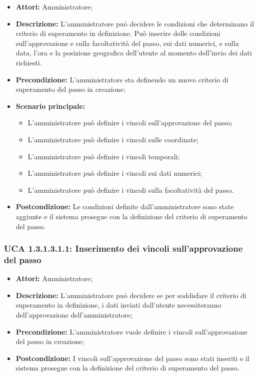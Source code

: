 \begin{itemize}
\item \textbf{Attori:}
Amministratore;
\item \textbf{Descrizione:}
L'amministratore può decidere le condizioni che determinano il criterio di superamento in definizione.
Può inserire delle condizioni sull'approvazione e sulla facoltatività del passo, sui dati numerici, e sulla data, l'ora e la posizione geografica dell'utente al momento dell'invio dei dati richiesti.
\item \textbf{Precondizione:}
L'amministratore sta definendo un nuovo criterio di superamento del passo in creazione;
\item \textbf{Scenario principale:}
\begin{itemize}
\item L'amministratore può definire i vincoli sull'approvazione del passo;
\item L'amministratore può definire i vincoli sulle coordinate;
\item L'amministratore può definire i vincoli temporali;
\item L'amministratore può definire i vincoli sui dati numerici;
\item L'amministratore può definire i vincoli sulla facoltatività del passo.
\end{itemize}
\item \textbf{Postcondizione:}
Le condizioni definite dall'amministratore sono state aggiunte e il sistema prosegue con la definizione del criterio di superamento del passo.
\end{itemize}

\hypertarget{A1.3.1.3.1.1}{}
\subsubsection{UCA 1.3.1.3.1.1: Inserimento dei vincoli sull'approvazione del passo}
\begin{itemize}
\item \textbf{Attori:}
Amministratore;
\item \textbf{Descrizione:}
L'amministratore può decidere se per soddisfare il criterio di superamento in definizione, i dati inviati dall'utente necessiteranno dell'approvazione dell'amministratore;
\item \textbf{Precondizione:}
L'amministratore vuole definire i vincoli sull'approvazione del passo in creazione;
\item \textbf{Postcondizione:}
I vincoli sull'approvazione del passo sono stati inseriti e il sistema prosegue con la definizione del criterio di superamento del passo.
\end{itemize}

